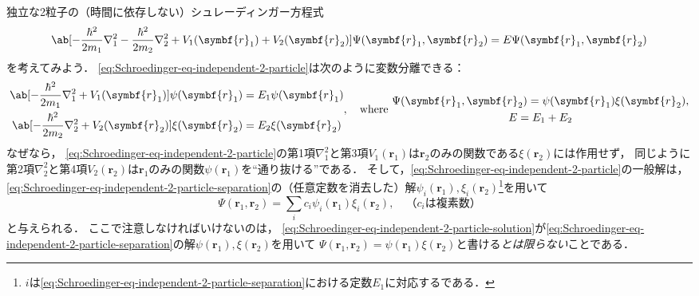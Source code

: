 \documentclass[
]{sotsu}
\begin{document}
独立な2粒子の（時間に依存しない）シュレーディンガー方程式
\begin{equation}
    \label{eq:Schroedinger-eq-independent-2-particle}
    \ab[
        -\frac{\hbar^2}{2 m_1} \nabla_1^2
        -\frac{\hbar^2}{2 m_2} \nabla_2^2
        + V_1 (\symbf{r}_1)
        + V_2 (\symbf{r}_2)
    ] \Psi(\symbf{r}_1, \symbf{r}_2)
    = E \Psi(\symbf{r}_1, \symbf{r}_2)
\end{equation}
を考えてみよう．
\cref{eq:Schroedinger-eq-independent-2-particle}は次のように変数分離できる：
\begin{align}
    \label{eq:Schroedinger-eq-independent-2-particle-separation}
    \begin{aligned}
        \ab[ -\frac{\hbar^2}{2 m_1} \nabla_1^2 + V_1 (\symbf{r}_1) ] \psi(\symbf{r}_1) &= E_1 \psi(\symbf{r}_1)  \\
        \ab[ -\frac{\hbar^2}{2 m_2} \nabla_2^2 + V_2 (\symbf{r}_2) ] \xi(\symbf{r}_2) &= E_2 \xi(\symbf{r}_2)
    \end{aligned}
    ,
    \quad \text{where } 
    \begin{gathered}
        \Psi(\symbf{r}_1, \symbf{r}_2) = \psi(\symbf{r}_1) \xi(\symbf{r}_2)
        , \\
        E = E_1 + E_2
    \end{gathered}
\end{align}
なぜなら，
\cref{eq:Schroedinger-eq-independent-2-particle}の第1項$\nabla_1^2$と第3項$V_1 (\symbf{r}_1)$は$\symbf{r}_2$のみの関数である$\xi(\symbf{r}_2)$には作用せず，
同じように第2項$\nabla_2^2$と第4項$V_2 (\symbf{r}_2)$は$\symbf{r}_1$のみの関数$\psi(\symbf{r}_1)$を``通り抜ける''である．
そして，\cref{eq:Schroedinger-eq-independent-2-particle}の一般解は，
\cref{eq:Schroedinger-eq-independent-2-particle-separation}の（任意定数を消去した）解$\psi_i (\symbf{r}_1), \xi_i (\symbf{r}_2)$\footnote{
    $i$は\cref{eq:Schroedinger-eq-independent-2-particle-separation}における定数$E_1$に対応するである．
}を用いて
\begin{equation}
    \label{eq:Schroedinger-eq-independent-2-particle-solution}
    \Psi(\symbf{r}_1, \symbf{r}_2)
    =
    \sum_i c_i \psi_i (\symbf{r}_1) \xi_i (\symbf{r}_2)
    , \quad \text{（$c_i$は複素数）}
\end{equation}
と与えられる．
ここで注意しなければいけないのは，
\cref{eq:Schroedinger-eq-independent-2-particle-solution}が\cref{eq:Schroedinger-eq-independent-2-particle-separation}の解$\psi (\symbf{r}_1), \xi (\symbf{r}_2)$を用いて
$\Psi(\symbf{r}_1, \symbf{r}_2) = \psi(\symbf{r}_1) \xi(\symbf{r}_2)$と書ける\emph{とは限らない}ことである．
\end{document}
